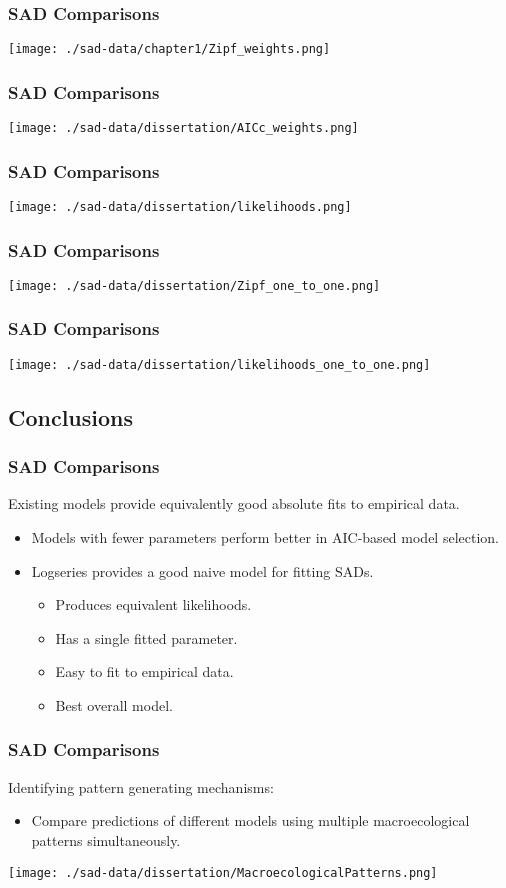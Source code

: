 \documentclass[14pt]{beamer}
\begin{document}
\begin{frame}{}
\frametitle{SAD Comparisons}
\texttt{[image: ./sad-data/chapter1/Zipf\_weights.png]}
\end{frame}


\begin{frame}{}
\frametitle{SAD Comparisons}
\texttt{[image: ./sad-data/dissertation/AICc\_weights.png]}
\end{frame}

\begin{frame}{}
\frametitle{SAD Comparisons}
\texttt{[image: ./sad-data/dissertation/likelihoods.png]}
\end{frame}

\begin{frame}{}
\frametitle{SAD Comparisons}
\texttt{[image: ./sad-data/dissertation/Zipf\_one\_to\_one.png]}
\end{frame}

\begin{frame}{}
\frametitle{SAD Comparisons}
\texttt{[image: ./sad-data/dissertation/likelihoods\_one\_to\_one.png]}
\end{frame}

\subsection{Conclusions}
\begin{frame}
\frametitle{SAD Comparisons}
Existing models provide equivalently good absolute fits to empirical data.
\begin{itemize}
\item Models with fewer parameters perform better in AIC-based model selection.\\
\item Logseries provides a good naive model for fitting SADs.\\
\begin{itemize}
\item Produces equivalent likelihoods.
\item Has a single fitted parameter.
\item Easy to fit to empirical data.
\item Best overall model.
\end{itemize}
\end{itemize}
\end{frame}

\begin{frame}[t]
\frametitle{SAD Comparisons}
Identifying pattern generating mechanisms:
\begin{itemize}
\item Compare predictions of different models using multiple macroecological patterns simultaneously.\\
\end{itemize}
\begin{center}  
\texttt{[image: ./sad-data/dissertation/MacroecologicalPatterns.png]}
\end{center}
\end{frame}
\end{document}

